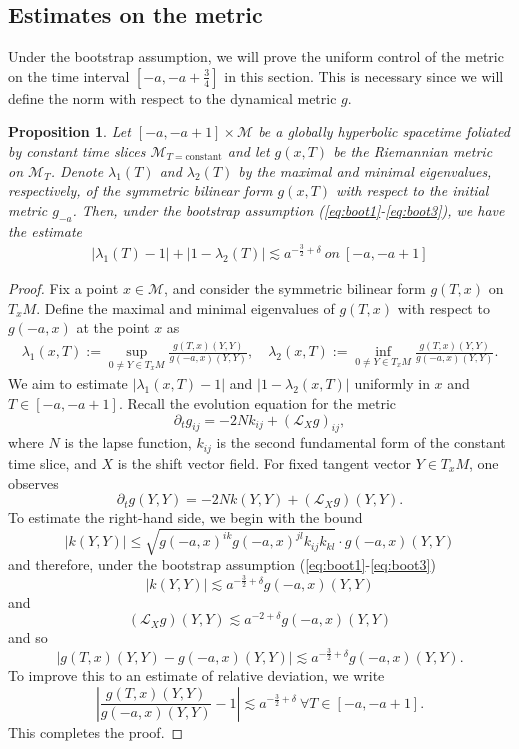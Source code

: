 \documentclass{amsart}
\newtheorem{proposition}{Proposition}[section]
\begin{document}
{\subsection{Estimates on the metric}
Under the bootstrap assumption, we will prove the uniform control of the metric on the time interval $[-a,-a+\frac{3}{4}]$ in this section. This is necessary since we will define the norm with respect to the dynamical metric $g$. 
\begin{proposition}
\label{apriori}
  Let $[-a,-a+1]\times \mathcal{M}$ be a globally hyperbolic spacetime foliated by constant time slices $\mathcal{M}_{T=\text{constant}}$ and let $g(x,T)$ be the Riemannian metric on $\mathcal{M}_{T}$. Denote $\lambda_{1}(T)$ and $\lambda_{2}(T)$ by the maximal and minimal eigenvalues, respectively, of the symmetric bilinear form $g(x,T)$ with respect to the initial metric $g_{-a}$. Then, under the bootstrap assumption (\ref{eq:boot1}-\ref{eq:boot3}), we have the estimate 
  \begin{align}
   |\lambda_{1}(T)-1|+|1-\lambda_{2}(T)|\lesssim a^{-\frac{3}{2}+\delta} ~on~[-a,-a+1]  
  \end{align}
\end{proposition}
\begin{proof}
    Fix a point $x \in \mathcal{M}$, and consider the symmetric bilinear form $g(T,x)$ on $T_x M$. Define the maximal and minimal eigenvalues of $g(T,x)$ with respect to $g(-a,x)$ at the point $x$ as
\begin{align}
\label{eq:eigdef}
\lambda_{1}(x,T) := \sup_{0 \neq Y \in T_x M} \frac{g(T,x)(Y,Y)}{g(-a,x)(Y,Y)}, \quad
\lambda_{2}(x,T) := \inf_{0 \neq Y \in T_x M} \frac{g(T,x)(Y,Y)}{g(-a,x)(Y,Y)}.
\end{align}
We aim to estimate $|\lambda_{1}(x,T)-1|$ and $|1-\lambda_{2}(x,T)|$ uniformly in $x$ and $T \in [-a,-a+1]$.
Recall the evolution equation for the metric
\[
\partial_{t}g_{ij}=-2Nk_{ij}+(\mathscr{L}_{X}g)_{ij},
\]
where $N$ is the lapse function, $k_{ij}$ is the second fundamental form of the constant time slice, and $X$ is the shift vector field. For fixed tangent vector $Y\in T_{x}M$, one observes 
\[
\partial_{t}g(Y,Y)=-2Nk(Y,Y)+(\mathscr{L}_{X}g)(Y,Y).
\]
To estimate the right-hand side, we begin with the bound 
\[
|k(Y,Y)|\leq \sqrt{g(-a,x)^{ik} g(-a,x)^{jl} k_{ij} k_{kl}} \cdot g(-a,x)(Y,Y)
\]
and therefore, under the bootstrap assumption (\ref{eq:boot1}-\ref{eq:boot3})
\[
|k(Y,Y)|\lesssim a^{-\frac{3}{2}+\delta}g(-a,x)(Y,Y)
\]
and 
\[
(\mathscr{L}_{X}g)(Y,Y)\lesssim a^{-2+\delta}g(-a,x)(Y,Y)
\]
and so 
\[
|g(T,x)(Y,Y) - g(-a,x)(Y,Y)| \lesssim a^{-\frac{3}{2}+\delta} g(-a,x)(Y,Y).
\]
To improve this to an estimate of relative deviation, we write
\[
\left| \frac{g(T,x)(Y,Y)}{g(-a,x)(Y,Y)} - 1 \right| \lesssim a^{-\frac{3}{2}+\delta}~\forall T\in [-a,-a+1].
\]
This completes the proof.
\end{proof} 

}
\end{document}
